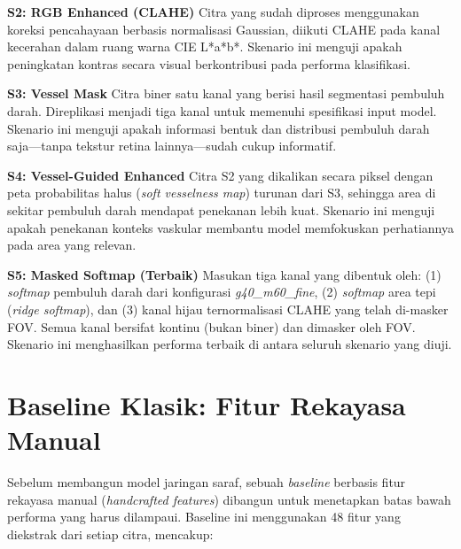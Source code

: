 \vspace{2mm}
\noindent\textbf{S2: RGB Enhanced (CLAHE)}
Citra yang sudah diproses menggunakan koreksi pencahayaan berbasis normalisasi Gaussian,
diikuti CLAHE pada kanal kecerahan dalam ruang warna CIE L*a*b*. Skenario ini menguji
apakah peningkatan kontras secara visual berkontribusi pada performa klasifikasi.

\vspace{2mm}
\noindent\textbf{S3: Vessel Mask}
Citra biner satu kanal yang berisi hasil segmentasi pembuluh darah. Direplikasi menjadi tiga
kanal untuk memenuhi spesifikasi input model. Skenario ini menguji apakah informasi bentuk
dan distribusi pembuluh darah saja---tanpa tekstur retina lainnya---sudah cukup informatif.

\vspace{2mm}
\noindent\textbf{S4: Vessel-Guided Enhanced}
Citra S2 yang dikalikan secara piksel dengan peta probabilitas halus (\textit{soft vesselness
map}) turunan dari S3, sehingga area di sekitar pembuluh darah mendapat penekanan lebih kuat.
Skenario ini menguji apakah penekanan konteks vaskular membantu model memfokuskan perhatiannya
pada area yang relevan.

\vspace{2mm}
\noindent\textbf{S5: Masked Softmap (Terbaik)}
Masukan tiga kanal yang dibentuk oleh: (1) \textit{softmap} pembuluh darah dari konfigurasi
\textit{g40\_m60\_fine}, (2) \textit{softmap} area tepi (\textit{ridge softmap}), dan
(3) kanal hijau ternormalisasi CLAHE yang telah di-masker FOV. Semua kanal bersifat kontinu
(bukan biner) dan dimasker oleh FOV. Skenario ini menghasilkan performa terbaik di antara
seluruh skenario yang diuji.

\section{Baseline Klasik: Fitur Rekayasa Manual}

Sebelum membangun model jaringan saraf, sebuah \textit{baseline} berbasis fitur rekayasa manual
(\textit{handcrafted features}) dibangun untuk menetapkan batas bawah performa yang harus
dilampaui. Baseline ini menggunakan 48 fitur yang diekstrak dari setiap citra, mencakup:

